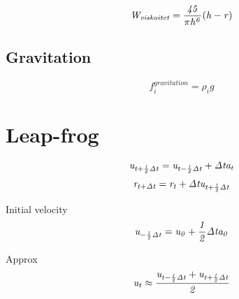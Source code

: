 \documentclass[a4paper,12pt,oneside,final]{extarticle}
\begin{document}
\begin{equation}
{\it W_{viskoitet} = \frac{45}{\pi h^6} {(h-r)}}
\end{equation}

\subsection{Gravitation}
\begin{equation}
f^{gravitation}_{i} = \rho^{}_{i}g
\end{equation}

\section{Leap-frog}
\begin{equation}
{\it u_{t + \frac{1}{2} \Delta t} = u_{t - \frac{1}{2} \Delta t} + \Delta t a_t}
\end{equation}
\begin{equation}
{\it r_{t+ \Delta t} = r_t + \Delta t u_{t + \frac{1}{2} \Delta t }}
\end{equation}

Initial velocity
\begin{equation}
{\it u_{- \frac{1}{2} \Delta t} = u_{0} + \frac{1}{2} \Delta t a_0}
\end{equation}

Approx
\begin{equation}
{\it u_t \approx \frac{u_{t - \frac{1}{2} \Delta t} + u_{t + \frac{1}{2} \Delta t} }{2} }
\end{equation}
\end{document}
